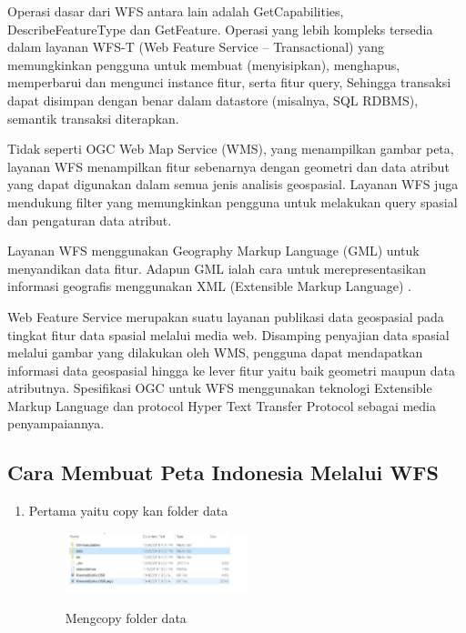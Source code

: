 Operasi dasar dari WFS antara lain adalah GetCapabilities, DescribeFeatureType dan GetFeature. Operasi yang lebih kompleks tersedia dalam layanan WFS-T (Web Feature Service – Transactional) yang memungkinkan pengguna untuk membuat (menyisipkan), menghapus, memperbarui dan mengunci instance fitur, serta fitur query, Sehingga transaksi dapat disimpan dengan benar dalam datastore (misalnya, SQL RDBMS), semantik transaksi diterapkan.

Tidak seperti OGC Web Map Service (WMS), yang menampilkan gambar peta, layanan WFS menampilkan fitur sebenarnya dengan geometri dan data atribut yang dapat digunakan dalam semua jenis analisis geospasial. Layanan WFS juga mendukung filter yang memungkinkan pengguna untuk melakukan query spasial dan pengaturan data atribut.

Layanan WFS menggunakan Geography Markup Language (GML) untuk menyandikan data fitur. Adapun GML ialah cara untuk merepresentasikan informasi geografis menggunakan XML (Extensible Markup Language) \cite{adityapeluang}.

Web Feature Service merupakan suatu layanan publikasi data geospasial pada tingkat fitur data spasial melalui media web. Disamping penyajian data spasial melalui gambar yang dilakukan oleh WMS, pengguna dapat mendapatkan informasi data geospasial hingga ke lever fitur yaitu baik geometri maupun data atributnya. Spesifikasi OGC untuk WFS menggunakan teknologi Extensible Markup Language dan protocol Hyper Text Transfer Protocol sebagai media penyampaiannya.

\subsection{Cara Membuat Peta Indonesia Melalui WFS}
\begin{enumerate}
\item Pertama yaitu copy kan folder data
\begin{figure}[htbp]
\centering
\includegraphics[width=0.5\textwidth]{pictures/Mengcopy_folder_data}
\label{labelgambar 2}
\caption{Mengcopy folder data}
\end{figure}
\end{enumerate}


